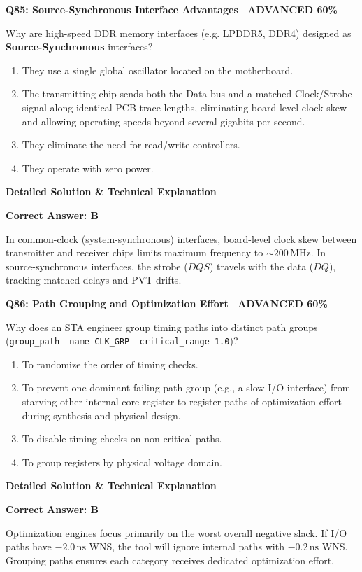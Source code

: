 \documentclass[11pt,a4paper]{article}
\newcommand{\badgeadv}{{\color{white}\colorbox{advred}{\bfseries\sffamily\tiny\ ADVANCED 60\%\ }}}
\newenvironment{qbox}[2]{%
  \begin{mdframed}[style=qstyle]%
  {\bfseries\sffamily\color{primaryblue}#1 \hfill #2}\par\vspace{2pt}%
}{%
  \end{mdframed}%
}
\newenvironment{ansbox}{%
  \begin{mdframed}[style=ansstyle]%
  {\bfseries\sffamily\color{ansgreen}\small Detailed Solution \& Technical Explanation}\par\vspace{2pt}\small%
}{%
  \end{mdframed}%
}
\begin{document}
\begin{qbox}{Q85: Source-Synchronous Interface Advantages}{\badgeadv}
Why are high-speed DDR memory interfaces (e.g. LPDDR5, DDR4) designed as \textbf{Source-Synchronous} interfaces?
\begin{enumerate}[label=\textbf{\Alph*.}]
  \item They use a single global oscillator located on the motherboard.
  \item The transmitting chip sends both the Data bus and a matched Clock/Strobe signal along identical PCB trace lengths, eliminating board-level clock skew and allowing operating speeds beyond several gigabits per second.
  \item They eliminate the need for read/write controllers.
  \item They operate with zero power.
\end{enumerate}
\end{qbox}
\begin{ansbox}
\textbf{Correct Answer: B}

In common-clock (system-synchronous) interfaces, board-level clock skew between transmitter and receiver chips limits maximum frequency to $\sim 200\,\text{MHz}$. In source-synchronous interfaces, the strobe ($DQS$) travels with the data ($DQ$), tracking matched delays and PVT drifts.
\end{ansbox}

\begin{qbox}{Q86: Path Grouping and Optimization Effort}{\badgeadv}
Why does an STA engineer group timing paths into distinct path groups (\texttt{group\_path -name CLK\_GRP -critical\_range 1.0})?
\begin{enumerate}[label=\textbf{\Alph*.}]
  \item To randomize the order of timing checks.
  \item To prevent one dominant failing path group (e.g., a slow I/O interface) from starving other internal core register-to-register paths of optimization effort during synthesis and physical design.
  \item To disable timing checks on non-critical paths.
  \item To group registers by physical voltage domain.
\end{enumerate}
\end{qbox}
\begin{ansbox}
\textbf{Correct Answer: B}

Optimization engines focus primarily on the worst overall negative slack. If I/O paths have $-2.0\,\text{ns}$ WNS, the tool will ignore internal paths with $-0.2\,\text{ns}$ WNS. Grouping paths ensures each category receives dedicated optimization effort.
\end{ansbox}
\end{document}
